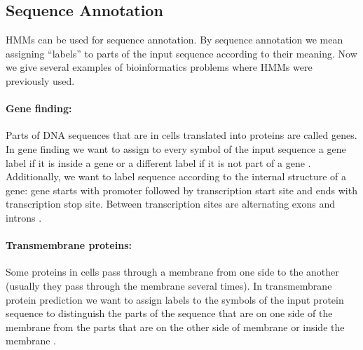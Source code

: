 \subsection{Sequence Annotation}


HMMs can be used for sequence annotation. By sequence annotation we mean
assigning ``labels'' to parts of the input sequence according to their meaning.
Now we give several examples of bioinformatics problems where HMMs were previously used.

\paragraph{Gene finding:} Parts of DNA sequences that are in cells translated
into proteins are called genes.  In gene finding we want to assign to every
symbol of the input sequence a gene label if it is inside a gene or a different
label if it is not part of a gene \cite{GeneWise2004, Brejova2005, Burge1997,
Alexanderson2004}. Additionally, we want to label sequence according to the
internal structure of a gene: gene starts with promoter followed by
transcription start site and ends with transcription stop site. Between
transcription sites are alternating exons and introns \cite{TODO}. 


\paragraph{Transmembrane proteins:} Some proteins in cells pass through a membrane
from one side to the another (usually they pass through the membrane several times).  In
transmembrane protein prediction we want to assign labels to the symbols of the input
protein sequence to distinguish the parts of the sequence that are on one side of the
membrane from the parts that are on the other side of membrane or inside the membrane
\cite{Brown2010}.

